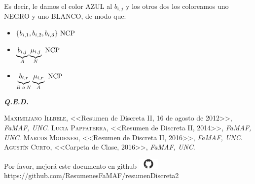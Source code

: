 \documentclass[12pt,a4paper]{report}
\newcommand{\QED}{\hfill \textit{\textbf{Q.E.D.}}}
\begin{document}
				\par Es decir, le damos el color AZUL al $b_{i, j}$ y los otros dos los coloreamos uno NEGRO y uno BLANCO, de modo que:
				\begin{itemize}
					\item $\lbrace b_{i, 1}, b_{i, 2}, b_{i, 3} \rbrace \textup{ NCP}$
			 		\item $\underbrace{b_{i, j}}_{A} \underbrace{\mu_{i, j}}_{N} \textup{ NCP}$
			 		\item $\underbrace{b_{i, r}}_{B \; o \; N} \underbrace{\mu_{i, r}}_{A} \textup{ NCP}$
				\end{itemize}

		\QED


\begin{thebibliography}{X}
 \textsc{Maximiliano Illbele},
<<Resumen de Discreta II, 16 de agosto de 2012>>,
\textit{FaMAF, UNC}.
 \textsc{Lucia Pappaterra},
<<Resumen de Discreta II, 2014>>,
\textit{FaMAF, UNC}.
 \textsc{Marcos Modenesi},
<<Resumen de Discreta II, 2016>>,
\textit{FaMAF, UNC}.
 \textsc{Agustín Curto},
<<Carpeta de Clase, 2016>>,
\textit{FaMAF, UNC}.
\end{thebibliography}

\vspace{\fill}
\begin{center}
Por favor, mejorá este documento en github
\includegraphics[width=1cm]{graphics/github.png} \\
https://github.com/ResumenesFaMAF/resumenDiscreta2
\end{center}
\end{document}

